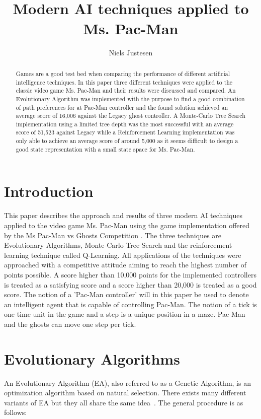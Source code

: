 \documentclass[conference]{IEEEtran}
\begin{document}
\title{\ \\ \LARGE\bf Modern AI techniques applied to Ms. Pac-Man}
\author{Niels Justesen}
\maketitle

\begin{abstract}
Games are a good test bed when comparing the performance of different artificial intelligence techniques. In this paper three different techniques were applied to the classic video game Ms. Pac-Man and their results were discussed and compared. An Evolutionary Algorithm was implemented with the purpose to find a good combination of path preferences for at Pac-Man controller and the found solution achieved an average score of 16,006 against the Legacy ghost controller. A Monte-Carlo Tree Search implementation using a limited tree depth was the most successful with an average score of 51,523 against Legacy while a Reinforcement Learning implementation was only able to achieve an average score of around 5,000 as it seems difficult to design a good state representation with a small state space for Ms. Pac-Man.
\end{abstract}

\section{Introduction}
This paper describes the approach and results of three modern AI techniques applied to the video game Ms. Pac-Man using the game implementation offered by the Ms Pac-Man vs Ghosts Competition \cite{Pac-Mancompetition}. The three techniques are Evolutionary Algorithms, Monte-Carlo Tree Search and the reinforcement learning technique called Q-Learning. All applications of the techniques were approached with a competitive attitude aiming to reach the highest number of points possible. A score higher than 10,000 points for the implemented controllers is treated as a satisfying score and a score higher than 20,000 is treated as a good score. The notion of a 'Pac-Man controller' will in this paper be used to denote an intelligent agent that is capable of controlling Pac-Man. The notion of a tick is one time unit in the game and a step is a unique position in a maze. Pac-Man and the ghosts can move one step per tick.

\section{Evolutionary Algorithms}
An Evolutionary Algorithm (EA), also referred to as a Genetic Algorithm, is an optimization algorithm based on natural selection. There exists many different variants of EA but they all share the same idea~\cite{EC}. The general procedure is as follows: 
\end{document}
